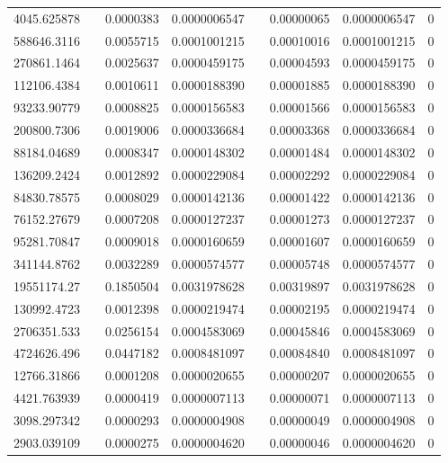 \documentclass[
journal=jacsat, %
manuscript=article]{achemso}
\begin{document}
\begin{table}[htbp]
{\begin{tabular}{rrrrrrrr}
    4045.625878 &       & 0.0000383 & 0.0000006547 &       & 0.00000065 & 0.0000006547 & 0 \\
    588646.3116 &       & 0.0055715 & 0.0001001215 &       & 0.00010016 & 0.0001001215 & 0 \\
    270861.1464 &       & 0.0025637 & 0.0000459175 &       & 0.00004593 & 0.0000459175 & 0 \\
    112106.4384 &       & 0.0010611 & 0.0000188390 &       & 0.00001885 & 0.0000188390 & 0 \\
    93233.90779 &       & 0.0008825 & 0.0000156583 &       & 0.00001566 & 0.0000156583 & 0 \\
    200800.7306 &       & 0.0019006 & 0.0000336684 &       & 0.00003368 & 0.0000336684 & 0 \\
    88184.04689 &       & 0.0008347 & 0.0000148302 &       & 0.00001484 & 0.0000148302 & 0 \\
    136209.2424 &       & 0.0012892 & 0.0000229084 &       & 0.00002292 & 0.0000229084 & 0 \\
    84830.78575 &       & 0.0008029 & 0.0000142136 &       & 0.00001422 & 0.0000142136 & 0 \\
    76152.27679 &       & 0.0007208 & 0.0000127237 &       & 0.00001273 & 0.0000127237 & 0 \\
    95281.70847 &       & 0.0009018 & 0.0000160659 &       & 0.00001607 & 0.0000160659 & 0 \\
    341144.8762 &       & 0.0032289 & 0.0000574577 &       & 0.00005748 & 0.0000574577 & 0 \\
    19551174.27 &       & 0.1850504 & 0.0031978628 &       & 0.00319897 & 0.0031978628 & 0 \\
    130992.4723 &       & 0.0012398 & 0.0000219474 &       & 0.00002195 & 0.0000219474 & 0 \\
    2706351.533 &       & 0.0256154 & 0.0004583069 &       & 0.00045846 & 0.0004583069 & 0 \\
    4724626.496 &       & 0.0447182 & 0.0008481097 &       & 0.00084840 & 0.0008481097 & 0 \\
    12766.31866 &       & 0.0001208 & 0.0000020655 &       & 0.00000207 & 0.0000020655 & 0 \\
    4421.763939 &       & 0.0000419 & 0.0000007113 &       & 0.00000071 & 0.0000007113 & 0 \\
    3098.297342 &       & 0.0000293 & 0.0000004908 &       & 0.00000049 & 0.0000004908 & 0 \\
    2903.039109 &       & 0.0000275 & 0.0000004620 &       & 0.00000046 & 0.0000004620 & 0 \\

\end{tabular}}
\end{table}
\end{document}
